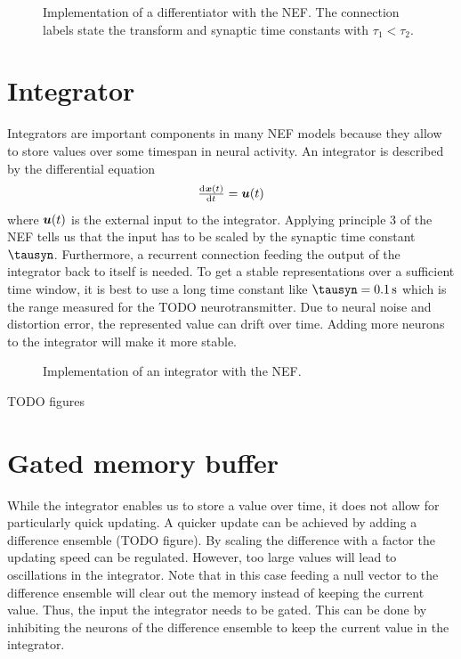 \begin{figure}
    \centering
    \caption{Implementation of a differentiator with the NEF\@. The connection labels state the transform and synaptic time constants with $\tau_1 < \tau_2$.}\label{fig:differentiator-net}
\end{figure}


\section{Integrator}
Integrators are important components in many NEF models because they allow to store values over some timespan in neural activity.
An integrator is described by the differential equation
\begin{equation}
    \od{\vc x(t)}{t} = \vc u(t)
\end{equation}
where $\bm{u}(t)$ is the external input to the integrator.
Applying principle 3 of the NEF tells us that the input has to be scaled by the synaptic time constant $\tausyn$.
Furthermore, a recurrent connection feeding the output of the integrator back to itself is needed.
To get a stable representations over a sufficient time window, it is best to use a long time constant like $\tausyn = \SI{0.1}{\second}$ which is the range measured for the TODO neurotransmitter.
Due to neural noise and distortion error, the represented value can drift over time.
Adding more neurons to the integrator will make it more stable.
\begin{figure}
    \centering
    \caption{Implementation of an integrator with the NEF.}\label{fig:integrator-net}
\end{figure}
TODO figures


\section{Gated memory buffer}
While the integrator enables us to store a value over time, it does not allow for particularly quick updating.
A quicker update can be achieved by adding a difference ensemble (TODO figure).
By scaling the difference with a factor the updating speed can be regulated.
However, too large values will lead to oscillations in the integrator.
Note that in this case feeding a null vector to the difference ensemble will clear out the memory instead of keeping the current value.
Thus, the input the integrator needs to be gated.
This can be done by inhibiting the neurons of the difference ensemble to keep the current value in the integrator.

